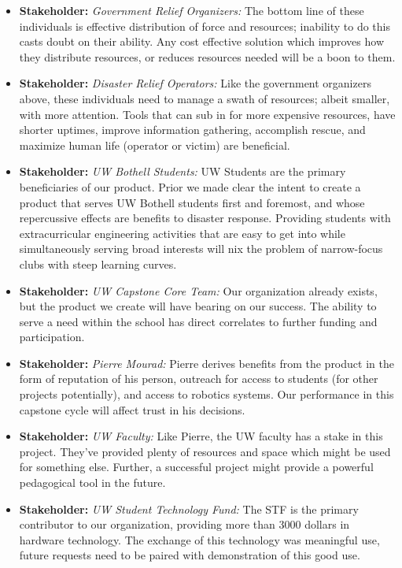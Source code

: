 \documentclass[a4paper, 10pt]{article}
\begin{document}
			\begin{itemize}
			\item
			\textbf{Stakeholder:} \emph{Government Relief Organizers:} The bottom line of these individuals is effective distribution of force and resources; inability to do this casts doubt on their ability. Any cost effective solution which improves how they distribute resources, or reduces resources needed will be a boon to them. 		
			
			\item
			\textbf{Stakeholder:} \emph{Disaster Relief Operators:} Like the government organizers above, these individuals need to manage a swath of resources; albeit smaller, with more attention. Tools that can sub in for more expensive resources, have shorter uptimes, improve information gathering, accomplish rescue, and maximize human life (operator or victim) are beneficial.
			
			\item
			\textbf{Stakeholder:} \emph{UW Bothell Students:} UW Students are the primary beneficiaries of our product. Prior we made clear the intent to create a product that serves UW Bothell students first and foremost, and whose repercussive effects are benefits to disaster response. Providing students with extracurricular engineering activities that are easy to get into while simultaneously serving broad interests will nix the problem of narrow-focus clubs with steep learning curves. 
			
			\item
			\textbf{Stakeholder:} \emph{UW Capstone Core Team:} Our organization already exists, but the product we create will have bearing on our success. The ability to serve a  need within the school has direct correlates to further funding and participation.

			\item
			\textbf{Stakeholder:} \emph{Pierre Mourad:} Pierre derives benefits from the product in the form of reputation of his person, outreach for access to students (for other projects potentially), and access to robotics systems. Our performance in this capstone cycle will affect trust in his decisions.
			
			\item
			\textbf{Stakeholder:} \emph{UW Faculty:} Like Pierre, the UW faculty has a stake in this project. They've provided plenty of resources and space which might be used for something else. Further, a successful project might provide a powerful pedagogical tool in the future.

			\item
			\textbf{Stakeholder:} \emph{UW Student Technology Fund:} The STF is the primary contributor to our organization, providing more than 3000 dollars in hardware technology. The exchange of this technology was meaningful use, future requests need to be paired with demonstration of this good use.
			\end{itemize}
			
\end{document}
